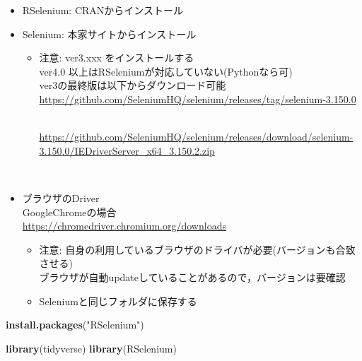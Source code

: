 \documentclass[
]{article}
\newenvironment{Shaded}{\begin{snugshade}}{\end{snugshade}}
\newcommand{\FunctionTok}[1]{\textcolor[rgb]{0.13,0.29,0.53}{\textbf{#1}}}
\newcommand{\NormalTok}[1]{#1}
\newcommand{\StringTok}[1]{\textcolor[rgb]{0.31,0.60,0.02}{#1}}
\providecommand{\tightlist}{%
  \setlength{\itemsep}{0pt}\setlength{\parskip}{0pt}}
\begin{document}
\begin{itemize}
\tightlist
\item
  RSelenium: CRANからインストール\\
\item
  Selenium: 本家サイトからインストール

  \begin{itemize}
  \tightlist
  \item
    注意: ver3.xxx をインストールする\\
    ver4.0 以上はRSeleniumが対応していない(Pythonなら可)\\
    ver3の最終版は以下からダウンロード可能\\
    \url{https://github.com/SeleniumHQ/selenium/releases/tag/selenium-3.150.0}\strut \\
    \url{https://github.com/SeleniumHQ/selenium/releases/download/selenium-3.150.0/IEDriverServer_x64_3.150.2.zip}\strut \\
  \end{itemize}
\item
  ブラウザのDriver\\
  GoogleChromeの場合\\
  \url{https://chromedriver.chromium.org/downloads}

  \begin{itemize}
  \tightlist
  \item
    注意: 自身の利用しているブラウザのドライバが必要(バージョンも合致させる)\\
    ブラウザが自動updateしていることがあるので，バージョンは要確認\\
  \item
    Seleniumと同じフォルダに保存する
  \end{itemize}
\end{itemize}

\begin{Shaded}
\begin{Highlighting}[]
\FunctionTok{install.packages}\NormalTok{(}\StringTok{"RSelenium"}\NormalTok{)}
\end{Highlighting}
\end{Shaded}

\begin{Shaded}
\begin{Highlighting}[]
\FunctionTok{library}\NormalTok{(tidyverse)}
\FunctionTok{library}\NormalTok{(RSelenium)}
\end{Highlighting}
\end{Shaded}
\end{document}
